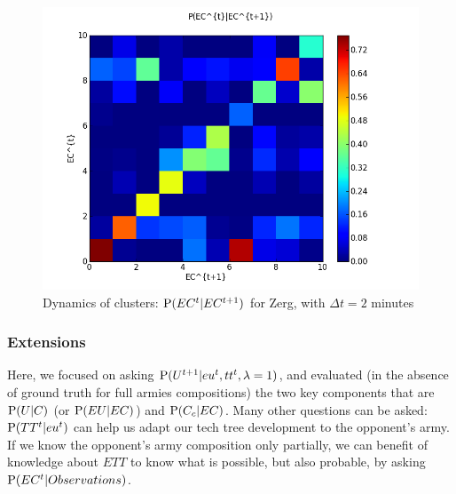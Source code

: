 \begin{figure}[h]
\centerline{\includegraphics[width=0.76\columnwidth]{images/Z_EC_knowing_ECnext.png}}
\caption{Dynamics of clusters: $\mathrm{P}(EC^t|EC^{t+1})$ for Zerg, with $\Delta t = 2$ minutes}
\label{ecknowingecnext}
\end{figure}



\subsubsection{Extensions}
\label{sec:armycompoextensions}

Here, we focused on asking $\mathrm{P}(U^{t+1}|eu^t, tt^t, \lambda=1)$, and evaluated (in the absence of ground truth for full armies compositions) the two key components that are $\mathrm{P}(U|C)$ (or $\mathrm{P}(EU|EC)$) and $\mathrm{P}(C_c|EC)$. Many other questions can be asked: $\mathrm{P}(TT^t|eu^t)$ can help us adapt our tech tree development to the opponent's army. If we know the opponent's army composition only partially, we can benefit of knowledge about $ETT$ to know what is possible, but also probable, by asking $\mathrm{P}(EC^t|Observations)$.


